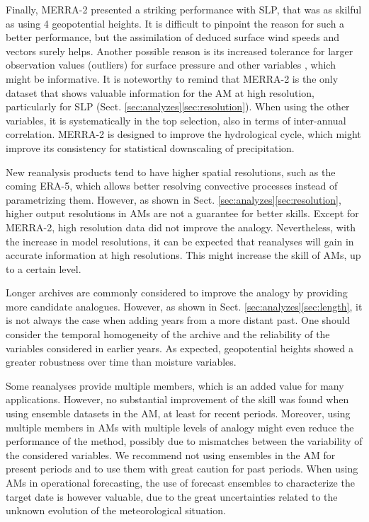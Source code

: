 \documentclass{ametsoc}
\begin{document}
Finally, MERRA-2 presented a striking performance with SLP, that was as skilful as using 4 geopotential heights. It is difficult to pinpoint the reason for such a better performance, but the assimilation of deduced surface wind speeds and vectors surely helps. Another possible reason is its increased tolerance for larger observation values (outliers) for surface pressure and other variables \citep{Gelaro2017}, which might be informative. It is noteworthy to remind that MERRA-2 is the only dataset that shows valuable information for the AM at high resolution, particularly for SLP (Sect. \ref{sec:analyzes}\ref{sec:resolution}). When using the other variables, it is systematically in the top selection, also in terms of inter-annual correlation. MERRA-2 is designed to improve the hydrological cycle, which might improve its consistency for statistical downscaling of precipitation.

New reanalysis products tend to have higher spatial resolutions, such as the coming ERA-5, which allows better resolving convective processes instead of parametrizing them. However, as shown in Sect. \ref{sec:analyzes}\ref{sec:resolution}, higher output resolutions in AMs are not a guarantee for better skills. Except for MERRA-2, high resolution data did not improve the analogy. Nevertheless, with the increase in model resolutions, it can be expected that reanalyses will gain in accurate information at high resolutions. This might increase the skill of AMs, up to a certain level. 

Longer archives are commonly considered to improve the analogy by providing more candidate analogues. However, as shown in Sect. \ref{sec:analyzes}\ref{sec:length}, it is not always the case when adding years from a more distant past. One should consider the temporal homogeneity of the archive and the reliability of the variables considered in earlier years. As expected, geopotential heights showed a greater robustness over time than moisture variables. 

Some reanalyses provide multiple members, which is an added value for many applications. However, no substantial improvement of the skill was found when using ensemble datasets in the AM, at least for recent periods. Moreover, using multiple members in AMs with multiple levels of analogy might even reduce the performance of the method, possibly due to mismatches between the variability of the considered variables. We recommend not using ensembles in the AM for present periods and to use them with great caution for past periods. When using AMs in operational forecasting, the use of forecast ensembles to characterize the target date is however valuable, due to the great uncertainties related to the unknown evolution of the meteorological situation.
\end{document}
